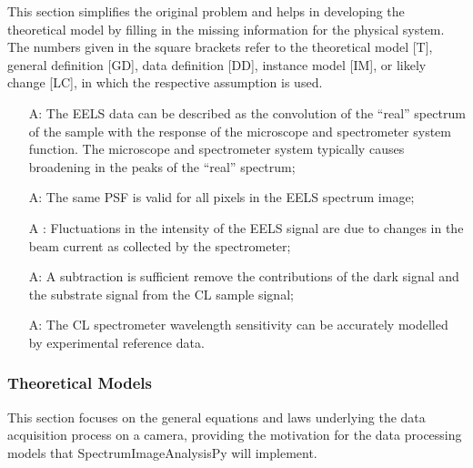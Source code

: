 \documentclass[12pt]{article}
\newcounter{assumpnum} %
\newcommand{\progname}{SpectrumImageAnalysisPy} %
\begin{document}
This section simplifies the original problem and helps in developing the
theoretical model by filling in the missing information for the physical
system. The numbers given in the square brackets refer to the theoretical model
[T], general definition [GD], data definition [DD], instance model [IM], or
likely change [LC], in which the respective assumption is used.

\begin{itemize}

	\item[A\refstepcounter{assumpnum}\theassumpnum \label{EELS_System_Response}:]
The EELS data can be described as the convolution of the ``real'' spectrum of
the sample with the response of the microscope and spectrometer system function.
The microscope and spectrometer system typically causes broadening in the peaks
of the ``real'' spectrum;
	
	\item[A\refstepcounter{assumpnum}\theassumpnum \label{EELS_PSF_variability}:]
The same PSF is valid for all pixels in the EELS spectrum image;
	
	\item[A\refstepcounter{assumpnum}\theassumpnum
\label{EELS_Intensity_Fluctuations}:] Fluctuations in the intensity of the EELS
signal are due to changes in the beam current as collected by the spectrometer;
	
	\item[A\refstepcounter{assumpnum}\theassumpnum \label{CL_Background}:] A
subtraction is sufficient  remove the contributions of the dark signal and the
substrate signal from the CL sample signal;
	
	\item[A\refstepcounter{assumpnum}\theassumpnum \label{CL_System_Response}:] The
CL spectrometer wavelength sensitivity can be accurately modelled by
experimental reference data.

\end{itemize}

\subsubsection{Theoretical Models}\label{sec_theoretical}

This section focuses on the general equations and laws underlying the data
acquisition process on a camera, providing the motivation for the data
processing models that \progname{} will implement.

~\newline
\end{document}
